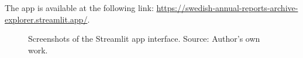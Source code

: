 \documentclass[
]{article}
\begin{document}
The app is available at the following link:
\url{https://swedish-annual-reports-archive-explorer.streamlit.app/}.

\begin{figure}

\begin{minipage}{\linewidth}



\end{minipage}%
\newline
\begin{minipage}{\linewidth}



\end{minipage}%

\caption{\label{fig-data-portal}Screenshots of the Streamlit app
interface. Source: Author's own work.}

\end{figure}%
\end{document}
